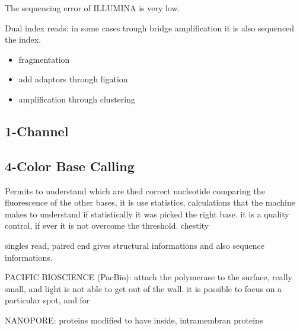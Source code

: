 The sequencing error of ILLUMINA is very low.


Dual index reads: in some cases trough bridge amplification it is also sequenced the index. 

\begin{itemize}
    \item fragmentation
    \item add adaptors through ligation
    \item amplification through clustering
\end{itemize}

\subsection{1-Channel}
\subsection{4-Color Base Calling}
Permits to understand which are  thed correct nucleotide comparing the fluorescence of the other bases, it is use statistics, calculations that the machine makes to understand if statistically it was picked the right base. it is a quality control, if ever it is not overcome the threshold. 
chestity



singles read, 
paired end gives structural informations and also sequence informations.

PACIFIC BIOSCIENCE (PacBio): attach the polymerase to the surface, really small, and light is not able to get out of the wall. it is possible to focus on a particular spot, and for



NANOPORE: proteins modified to have inside, intramembran proteins

